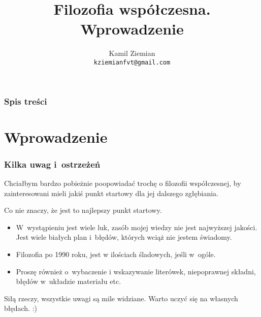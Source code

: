 \documentclass[10pt,t]{beamer}
\title{Filozofia współczesna. Wprowadzenie}
\author{Kamil Ziemian \\
  \texttt{kziemianfvt@gmail.com}}
\begin{document}






\RaggedRight





\maketitle





\begin{frame}
  \frametitle{Spis treści}


  \tableofcontents %

\end{frame}










\section{Wprowadzenie}



\begin{frame}
  \frametitle{Kilka uwag i~ostrzeżeń}


  Chciałbym bardzo pobieżnie poopowiadać trochę o filozofii współczesnej,
  by zainteresowani mieli jakiś punkt startowy dla jej dalszego zgłębiania.

  Co nie znaczy, że jest to najlepszy punkt startowy.
  \begin{itemize}
    \RaggedRight

  \item W~wystąpieniu jest wiele luk, zasób mojej wiedzy nie jest
    najwyższej jakości. Jest wiele białych plan i~błędów, których wciąż
    nie jestem świadomy.

  \item Filozofia po 1990 roku, jest w ilościach śladowych, jeśli w~ogóle.

  \item Proszę również o~wybaczenie i wskazywanie literówek, niepoprawnej
    składni, błędów w~układzie materiału etc.

  \end{itemize}

  Siłą rzeczy, wszystkie uwagi są mile widziane. Warto uczyć się na własnych
  błędach. :)

\end{frame}
\end{document}
